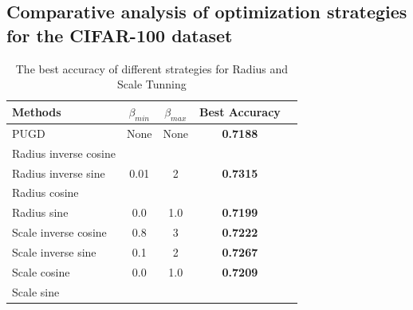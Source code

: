\documentclass[10pt,twocolumn,letterpaper]{article}
\begin{document}
\subsection{Comparative analysis of optimization strategies for the CIFAR-100 dataset}
\label{appendix:cifar100}
\begin{table}[H]
	\begin{center}
		\begin{tabular}{|l|c|c|c|c|}
			\hline
			Methods & $\beta_{min}$ & $\beta_{max}$ & Best Accuracy \\
			\hline
			PUGD	& None &	None & \bf{0.7188} \\
			\hline
			Radius inverse cosine &  &  & \bf{} \\
			Radius inverse sine 	& 0.01	& 2 & \bf{0.7315} \\
			Radius cosine &  &	& \bf{} \\
			Radius sine 	& 0.0	& 1.0 & \bf{0.7199} \\
			\hline
			Scale inverse cosine & 0.8	& 3 & \bf{0.7222} \\
			Scale inverse sine 	& 0.1	& 2 & \bf{0.7267} \\
			Scale cosine & 0.0	& 1.0 & \bf{0.7209} \\
			Scale sine 	&  &	& \bf{} \\
			\hline
		\end{tabular}
	\end{center}
	\caption{%
		The best accuracy of different strategies for Radius and Scale Tunning
	}
	\label{tab:cifar100}
\end{table}
\end{document}
